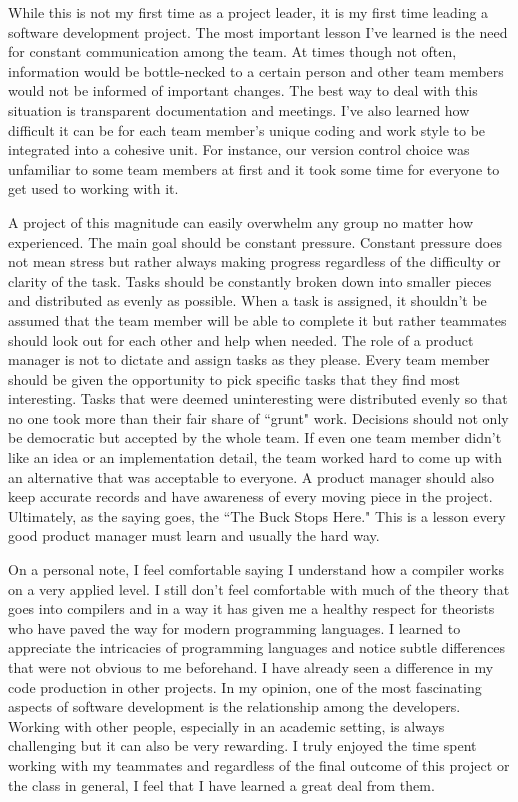 \documentclass[12pt]{report}
\begin{document}
While this is not my first time as a project leader, it is my first time leading a software development project. The most important lesson I've learned is the need for constant communication among the team. At times though not often, information would be bottle-necked to a certain person and other team members would not be informed of important changes. The best way to deal with this situation is transparent documentation and meetings. I've also learned how difficult it can be for each team member's unique coding and work style to be integrated into a cohesive unit. For instance, our version control choice was unfamiliar to some team members at first and it took some time for everyone to get used to working with it.

A project of this magnitude can easily overwhelm any group no matter how experienced. The main goal should be constant pressure. Constant pressure does not mean stress but rather always making progress regardless of the difficulty or clarity of the task. Tasks should be constantly broken down into smaller pieces and distributed as evenly as possible. When a task is assigned, it shouldn't be assumed that the team member will be able to complete it but rather teammates should look out for each other and help when needed. The role of a product manager is not to dictate and assign tasks as they please. Every team member should be given the opportunity to pick specific tasks that they find most interesting. Tasks that were deemed uninteresting were distributed evenly so that no one took more than their fair share of ``grunt" work. Decisions should not only be democratic but accepted by the whole team. If even one team member didn’t like an idea or an implementation detail, the team worked hard to come up with an alternative that was acceptable to everyone. A product manager should also keep accurate records and have awareness of every moving piece in the project. Ultimately, as the saying goes, the ``The Buck Stops Here." This is a lesson every good product manager must learn and usually the hard way.

On a personal note, I feel comfortable saying I understand how a compiler works on a very applied level. I still don't feel comfortable with much of the theory that goes into compilers and in a way it has given me a healthy respect for theorists who have paved the way for modern programming languages. I learned to appreciate the intricacies of programming languages and notice subtle differences that were not obvious to me beforehand. I have already seen a difference in my code production in other projects. In my opinion, one of the most fascinating aspects of software development is the relationship among the developers. Working with other people, especially in an academic setting, is always challenging but it can also be very rewarding. I truly enjoyed the time spent working with my teammates and regardless of the final outcome of this project or the class in general, I feel that I have learned a great deal from them.
\end{document}
